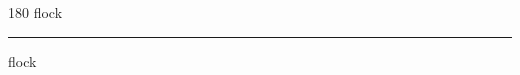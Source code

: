 
\begin{frame}
\begin{center}
\begin{turn}{180}
{\fontsize{2.5cm}{1em}\selectfont flock}
\end{turn}
\vspace{1em}\par  
\hrule
\vspace{1em}\par  
{\fontsize{2.5cm}{1em}\selectfont flock}
\end{center}
\end{frame}
